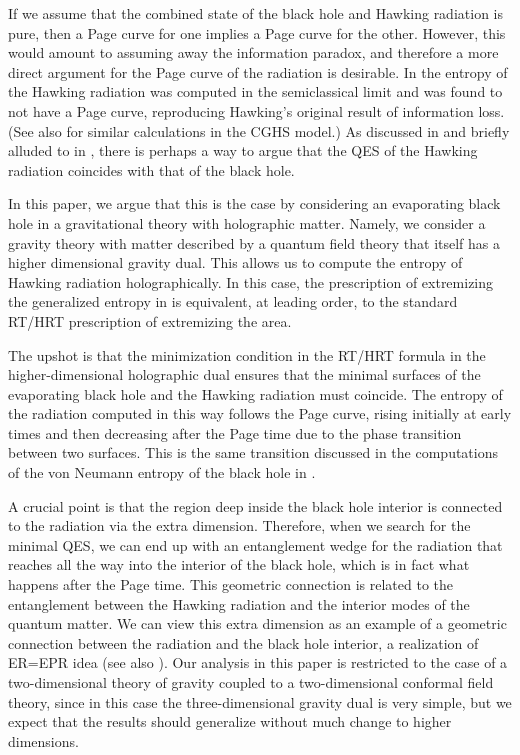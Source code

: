 \documentclass[11pt]{article}
\begin{document}
If we assume that the combined state of the black hole and Hawking radiation is pure, then a Page curve for one implies a Page curve for the other. 
However, this would amount to assuming away the information paradox, and therefore a more direct argument for the Page curve of the radiation is desirable. 
In \cite{Almheiri:2019psf} the entropy of the Hawking radiation was computed in the semiclassical limit and was found to not have a Page curve, reproducing Hawking's original result of information loss.
(See also \cite{Fiola:1994ir} for similar calculations in the CGHS model.) 
As discussed in \cite{Penington:2019npb} and briefly alluded to in \cite{Almheiri:2019psf, Hayden:2018khn}, there is perhaps a way to argue that the QES of the Hawking radiation coincides with that of the black hole.

In this paper, we argue that this is the case by  considering an evaporating black hole in a gravitational theory with holographic matter. 
Namely, we consider a gravity theory with matter described by a quantum field theory that itself has a higher dimensional gravity dual. 
This allows us to compute the entropy of Hawking radiation holographically.
In this case, the prescription of extremizing the generalized entropy in \cite{Engelhardt:2014gca} is equivalent, at leading order, to the standard RT/HRT prescription \cite{Ryu:2006bv,Hubeny:2007xt} of extremizing the area.

The upshot is that the minimization condition in the RT/HRT formula in the higher-dimensional holographic dual ensures that the minimal surfaces of the evaporating black hole and the Hawking radiation must coincide.
The entropy of the radiation computed in this way follows the Page curve, rising initially at early times and then decreasing after the Page time due to the phase transition between two surfaces.  
This is the same transition discussed in the computations of the von Neumann entropy of the black hole in \cite{Penington:2019npb,Almheiri:2019psf}. 

A crucial point is that the region deep inside the black hole interior is connected to the radiation via the extra dimension. 
Therefore, when we search for the minimal QES, we can end up with an entanglement wedge for the radiation that reaches all the way into the interior of the black hole, which is in fact what happens after the Page time. 
This geometric connection is related to the entanglement between the Hawking radiation and the interior modes of the quantum matter. 
We can view this extra dimension as an example of a geometric connection between the radiation and the black hole interior, a realization of ER=EPR \cite{Maldacena:2013xja, Maldacena:2013t1} idea (see also \cite{Susskind:2012uw, Papadodimas:2012aq}).
Our analysis in this paper is restricted to the case of a two-dimensional theory of gravity coupled to a two-dimensional conformal field theory, since in this case the  three-dimensional  gravity dual is very simple, but we expect that the results should generalize without much change to higher dimensions. 
\end{document}
